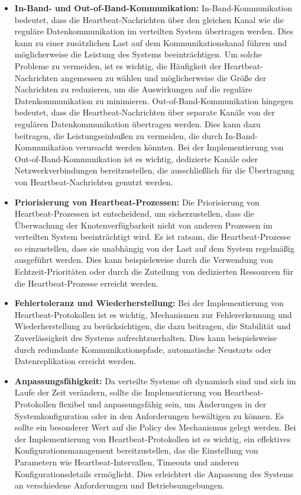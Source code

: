 \documentclass[../vs-script-first-v01.tex]{subfiles}
\begin{document}
\begin{itemize} 
\item \textbf{In-Band- und Out-of-Band-Kommunikation:} In-Band-Kommunikation bedeutet, dass die Heartbeat-Nachrichten über den gleichen Kanal wie die reguläre Datenkommunikation im verteilten System übertragen werden. Dies kann zu einer zusätzlichen Last auf dem Kommunikationskanal führen und möglicherweise die Leistung des Systems beeinträchtigen. Um solche Probleme zu vermeiden, ist es wichtig, die Häufigkeit der Heartbeat-Nachrichten angemessen zu wählen und möglicherweise die Größe der Nachrichten zu reduzieren, um die Auswirkungen auf die reguläre Datenkommunikation zu minimieren. Out-of-Band-Kommunikation hingegen bedeutet, dass die Heartbeat-Nachrichten über separate Kanäle von der regulären Datenkommunikation übertragen werden. Dies kann dazu beitragen, die Leistungseinbußen zu vermeiden, die durch In-Band-Kommunikation verursacht werden könnten. Bei der Implementierung von Out-of-Band-Kommunikation ist es wichtig, dedizierte Kanäle oder Netzwerkverbindungen bereitzustellen, die ausschließlich für die Übertragung von Heartbeat-Nachrichten genutzt werden.
\item \textbf{Priorisierung von Heartbeat-Prozessen:} Die Priorisierung von Heartbeat-Prozessen ist entscheidend, um sicherzustellen, dass die Überwachung der Knotenverfügbarkeit nicht von anderen Prozessen im verteilten System beeinträchtigt wird. Es ist ratsam, die Heartbeat-Prozesse so einzustellen, dass sie unabhängig von der Last auf dem System regelmäßig ausgeführt werden. Dies kann beispielsweise durch die Verwendung von Echtzeit-Prioritäten oder durch die Zuteilung von dedizierten Ressourcen für die Heartbeat-Prozesse erreicht werden.
\item \textbf{Fehlertoleranz und Wiederherstellung:} Bei der Implementierung von Heartbeat-Protokollen ist es wichtig, Mechanismen zur Fehlererkennung und Wiederherstellung zu berücksichtigen, die dazu beitragen, die Stabilität und Zuverlässigkeit des Systems aufrechtzuerhalten. Dies kann beispielsweise durch redundante Kommunikationspfade, automatische Neustarts oder Datenreplikation erreicht werden.
\item \textbf{Anpassungsfähigkeit:} Da verteilte Systeme oft dynamisch sind und sich im Laufe der Zeit verändern, sollte die Implementierung von Heartbeat-Protokollen flexibel und anpassungsfähig sein, um Änderungen in der Systemkonfiguration oder in den Anforderungen bewältigen zu können. Es sollte ein besonderer Wert auf die Policy des Mechanismus gelegt werden. Bei der Implementierung von Heartbeat-Protokollen ist es wichtig, ein effektives Konfigurationsmanagement bereitzustellen, das die Einstellung von Parametern wie Heartbeat-Intervallen, Timeouts und anderen Konfigurationsdetails ermöglicht. Dies erleichtert die Anpassung des Systems an verschiedene Anforderungen und Betriebsumgebungen.

\end{itemize}
\end{document}
